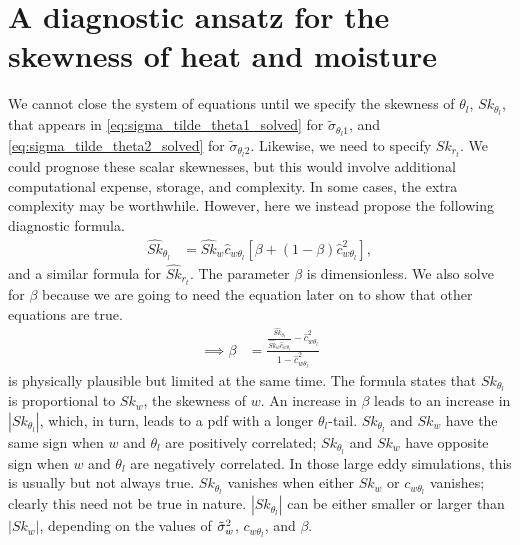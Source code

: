 \section{A diagnostic ansatz for the skewness of heat and moisture}\label{sec:diag_ansatz}

We cannot close the system of equations until we specify the skewness of $\theta_l$, $Sk_{\theta_l}$,
that appears in \cref{eq:sigma_tilde_theta1_solved} for $\tilde{\sigma}_{\theta_l 1}$,
and \cref{eq:sigma_tilde_theta2_solved} for $\tilde{\sigma}_{\theta_l 2}$.
Likewise, we need to specify $Sk_{r_t}$.
We could prognose these scalar skewnesses, but this would involve additional computational expense,
storage, and complexity.
In some cases, the extra complexity may be worthwhile.
However, here we instead propose the following diagnostic formula.
\begin{align}
    \label{eq:Sk_hat_thl_beta}
    \widehat{Sk}_{\theta_l}
    &= \widehat{Sk}_w \widehat{c}_{w \theta_l} \left[\beta + (1-\beta) \widehat{c}_{w \theta_l}^2 \right],
\end{align}
and a similar formula for $\widehat{Sk}_{r_t}$.
The parameter $\beta$ is dimensionless.
We also solve for $\beta$ because we are going to need the equation later on to show that other equations are true.
\begin{align}
    \label{eq:beta}
    \implies \beta
    &=\frac{
        \frac{\widehat{Sk}_{\theta_l}}{\widehat{Sk}_w \widehat{c}_{w \theta_l}} - \widehat{c}_{w \theta_l}^2}
    {1 - \widehat{c}_{w \theta_l}^2}
\end{align}
 is physically plausible but limited at the same time.
The formula states that $Sk_{\theta_l}$ is proportional to $Sk_w$, the skewness of $w$.
An increase in $\beta$ leads to an increase in $\left| Sk_{\theta_l} \right|$, which, in turn,
leads to a \gls{pdf} with a longer $\theta_l$-tail.
$Sk_{\theta_l}$ and $Sk_w$ have the same sign when $w$ and $\theta_l$ are positively correlated;
$Sk_{\theta_l}$ and $Sk_w$ have opposite sign when $w$ and $\theta_l$ are negatively correlated.
In those large eddy simulations, this is usually but not always true.
$Sk_{\theta_l}$ vanishes when either $Sk_w$ or $c_{w \theta_l}$ vanishes;
clearly this need not be true in nature.
$\left| Sk_{\theta_l} \right|$ can be either smaller or larger than $\left| Sk_w \right|$,
depending on the values of ${\tilde{\sigma}_w}^2$, $c_{w \theta_l}$, and $\beta$.

